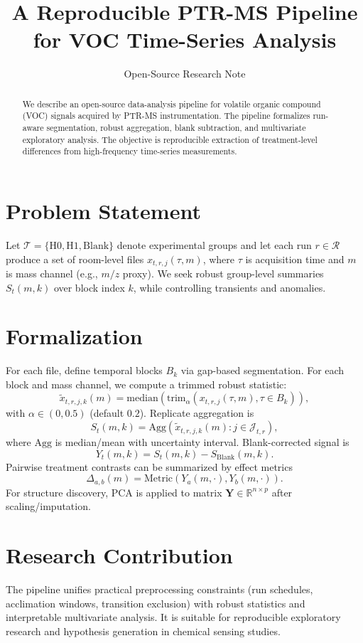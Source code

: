 ﻿\documentclass[11pt,a4paper]{article}
\title{A Reproducible PTR-MS Pipeline for VOC Time-Series Analysis}
\author{Open-Source Research Note}
\date{}
\begin{document}
\maketitle

\begin{abstract}
We describe an open-source data-analysis pipeline for volatile organic compound (VOC) signals acquired by PTR-MS instrumentation. The pipeline formalizes run-aware segmentation, robust aggregation, blank subtraction, and multivariate exploratory analysis. The objective is reproducible extraction of treatment-level differences from high-frequency time-series measurements.
\end{abstract}

\section{Problem Statement}
Let $\mathcal{T}=\{\mathrm{H0},\mathrm{H1},\mathrm{Blank}\}$ denote experimental groups and let each run $r\in\mathcal{R}$ produce a set of room-level files $x_{t,r,j}(\tau,m)$, where $\tau$ is acquisition time and $m$ is mass channel (e.g., $m/z$ proxy). We seek robust group-level summaries $S_t(m,k)$ over block index $k$, while controlling transients and anomalies.

\section{Formalization}
For each file, define temporal blocks $B_k$ via gap-based segmentation. For each block and mass channel, we compute a trimmed robust statistic:
\[
\tilde{x}_{t,r,j,k}(m)=\mathrm{median}\left(\mathrm{trim}_{\alpha}(x_{t,r,j}(\tau,m),\tau\in B_k)\right),
\]
with $\alpha\in(0,0.5)$ (default $0.2$). Replicate aggregation is
\[
S_t(m,k)=\mathrm{Agg}\left(\tilde{x}_{t,r,j,k}(m): j\in\mathcal{J}_{t,r}\right),
\]
where $\mathrm{Agg}$ is median/mean with uncertainty interval. Blank-corrected signal is
\[
Y_t(m,k)=S_t(m,k)-S_{\mathrm{Blank}}(m,k).
\]
Pairwise treatment contrasts can be summarized by effect metrics
\[
\Delta_{a,b}(m)=\mathrm{Metric}(Y_a(m,\cdot),Y_b(m,\cdot)).
\]
For structure discovery, PCA is applied to matrix $\mathbf{Y}\in\mathbb{R}^{n\times p}$ after scaling/imputation.

\section{Research Contribution}
The pipeline unifies practical preprocessing constraints (run schedules, acclimation windows, transition exclusion) with robust statistics and interpretable multivariate analysis. It is suitable for reproducible exploratory research and hypothesis generation in chemical sensing studies.
\end{document}

